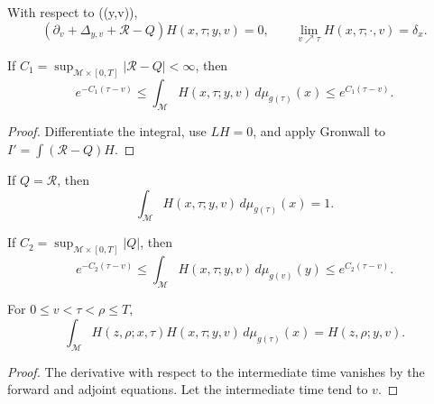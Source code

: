 \begin{lemma}
\label{lem:chow-iii-heat-kernel-second-variables-adjoint}
With respect to ((y,v)),
\[
 (\partial_v+\Delta_{y,v}+\mathcal R-Q)H(x,\tau;y,v)=0,
 \qquad \lim_{v\nearrow\tau}H(x,\tau;\cdot,v)=\delta_x.
\]
\end{lemma}

\begin{lemma}
\label{lem:chow-iii-closed-heat-kernel-mass-bound}
If \(C_1=\sup_{\mathcal M\times[0,T]}|\mathcal R-Q|<\infty\), then
\[
 e^{-C_1(\tau-v)}\le
 \int_{\mathcal M}H(x,\tau;y,v)\,d\mu_{g(\tau)}(x)
 \le e^{C_1(\tau-v)}.
\]
\end{lemma}
\begin{proof}
\sketch Differentiate the integral, use \(LH=0\), and apply Gronwall to
\(I'=\int(\mathcal R-Q)H\).
\end{proof}

\begin{corollary}[Mass preservation when \(Q=\mathcal R\)]
\label{cor:chow-iii-closed-heat-kernel-mass-preservation}
If \(Q=\mathcal R\), then
\[
 \int_{\mathcal M}H(x,\tau;y,v)\,d\mu_{g(\tau)}(x)=1.
\]
\end{corollary}

\begin{lemma}
\label{lem:chow-iii-closed-heat-kernel-second-mass-bound}
If \(C_2=\sup_{\mathcal M\times[0,T]}|Q|\), then
\[
 e^{-C_2(\tau-v)}\le
 \int_{\mathcal M}H(x,\tau;y,v)\,d\mu_{g(v)}(y)
 \le e^{C_2(\tau-v)}.
\]
\end{lemma}

\begin{lemma}
\label{lem:chow-iii-closed-heat-kernel-semigroup}
For \(0\le v<\tau<\rho\le T\),
\[
 \int_{\mathcal M}H(z,\rho;x,\tau)H(x,\tau;y,v)
 \,d\mu_{g(\tau)}(x)=H(z,\rho;y,v).
\]
\end{lemma}
\begin{proof}
\sketch The derivative with respect to the intermediate time vanishes by the forward
and adjoint equations.  Let the intermediate time tend to \(v\).
\end{proof}

